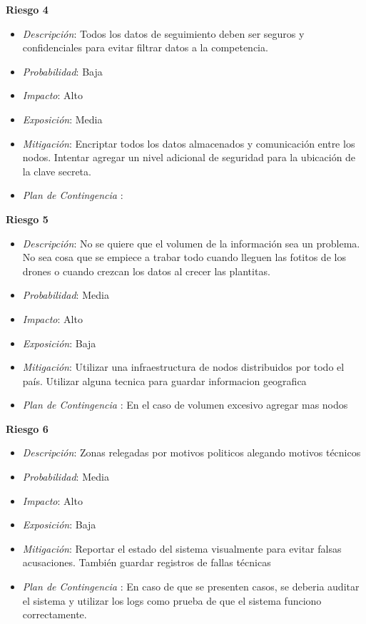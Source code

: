 \textbf{Riesgo 4}
\begin{itemize}
 \item \textsl{Descripci\'on}: Todos los datos de seguimiento deben ser seguros y confidenciales para evitar filtrar datos a la competencia.
 \item \textsl{Probabilidad}: Baja
 \item \textsl{Impacto}: Alto
 \item \textsl{Exposición}: Media
 \item \textsl{Mitigación}: Encriptar todos los datos almacenados y comunicaci\'on entre los nodos. Intentar agregar un nivel adicional de seguridad para la ubicaci\'on de la clave secreta.
 \item \textsl{Plan de Contingencia} : 
\end{itemize}

\textbf{Riesgo 5}
\begin{itemize}
 \item \textsl{Descripci\'on}: No se quiere que el volumen de la informaci\'on sea un problema. No sea cosa que se empiece a trabar todo cuando lleguen las fotitos de los drones o cuando crezcan los datos al crecer las plantitas.
 \item \textsl{Probabilidad}: Media
 \item \textsl{Impacto}: Alto	
 \item \textsl{Exposición}: Baja
 \item \textsl{Mitigación}: Utilizar una infraestructura de nodos distribuidos por todo el país. Utilizar alguna tecnica para guardar informacion geografica
 \item \textsl{Plan de Contingencia} : En el caso de volumen excesivo agregar mas nodos
\end{itemize}


\textbf{Riesgo 6}
\begin{itemize}
 \item \textsl{Descripci\'on}: Zonas relegadas por motivos politicos alegando motivos t\'ecnicos
 \item \textsl{Probabilidad}: Media
 \item \textsl{Impacto}: Alto
 \item \textsl{Exposición}: Baja
 \item \textsl{Mitigación}: Reportar el estado del sistema visualmente para evitar falsas acusaciones. Tambi\'en guardar registros de fallas t\'ecnicas
 \item \textsl{Plan de Contingencia} : En caso de que se presenten casos, se deberia auditar el sistema y utilizar los logs como prueba de que el sistema funciono correctamente. 
\end{itemize}


